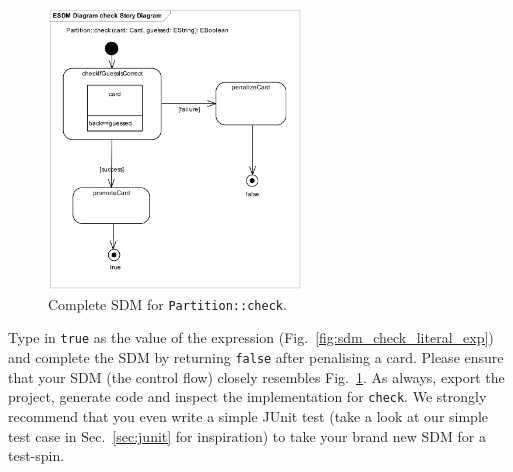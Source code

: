\begin{figure}[htbp]
\begin{center}
  \includegraphics[width=0.6\textwidth]{pics/sdmBilder/check/sdm40}
  \caption{Complete SDM for \texttt{Partition::check}.}  
  \label{fig:sdm_check_finish}
\end{center}
\end{figure}

Type in \texttt{true} as the value of the expression
(Fig.~\ref{fig:sdm_check_literal_exp}) and complete the SDM by returning
\texttt{false} after penalising a card.  Please ensure that your SDM (the
control flow) closely resembles Fig.~\ref{fig:sdm_check_finish}.  As always,
export the project, generate code and inspect the implementation for
\texttt{check}.  We strongly recommend that you even write a simple JUnit test
(take a look at our simple test case in Sec.~\ref{sec:junit} for inspiration)
to take your brand new SDM for a test-spin.
